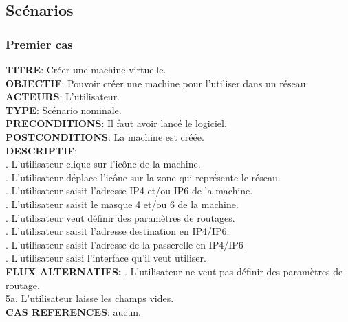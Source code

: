 \subsection{Scénarios}

\subsubsection{Premier cas}

\noindent\textbf{TITRE}: Créer une machine virtuelle.\\
\textbf{OBJECTIF}: Pouvoir créer une machine pour l’utiliser dans un réseau.\\
\textbf{ACTEURS}: L’utilisateur.\\
\textbf{TYPE}: Scénario nominale.\\
\textbf{PRECONDITIONS}: Il faut avoir lancé le logiciel.\\
\textbf{POSTCONDITIONS}: La machine est créée.\\
\textbf{DESCRIPTIF}:\\ 
. L’utilisateur clique sur l’icône de la machine.\\
. L’utilisateur déplace l’icône sur la zone qui représente le réseau.\\
. L’utilisateur saisit l’adresse IP4 et/ou IP6 de la machine.\\
. L’utilisateur saisit le masque 4 et/ou 6 de la machine.\\
. L’utilisateur veut définir des paramètres de routages.\\
. L’utilisateur saisit l’adresse destination en IP4/IP6.\\	
. L'utilisateur saisit l'adresse de la passerelle en IP4/IP6\\
. L’utilisateur saisi l’interface qu’il veut utiliser.\\
\textbf{FLUX ALTERNATIFS:}
. L'utilisateur ne veut pas définir des paramètres de routage.\\
\indent\indent5a. L'utilisateur laisse les champs vides.\\
\textbf{CAS REFERENCES}: aucun.\\


